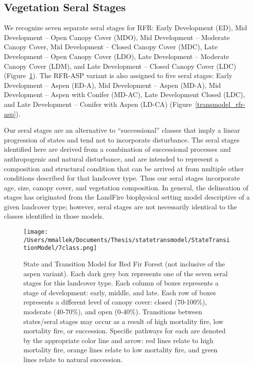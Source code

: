 \subsection*{Vegetation Seral Stages}
We recognize seven separate seral stages for RFR: Early Development (ED), Mid Development – Open Canopy Cover (MDO), Mid Development – Moderate Canopy Cover, Mid Development – Closed Canopy Cover (MDC), Late Development – Open Canopy Cover (LDO), Late Development – Moderate Canopy Cover (LDM), and Late Development – Closed Canopy Cover (LDC) (Figure~\ref{transmodel_rfr}). The RFR-ASP variant is also assigned to five seral stages: Early Development – Aspen (ED-A), Mid Development – Aspen (MD-A), Mid Development – Aspen with Conifer (MD-AC), Late Development Closed (LDC), and Late Development – Conifer with Aspen (LD-CA) (Figure~\ref{transmodel_rfr-asp}). 

Our seral stages are an alternative to ``successional'' classes that imply a linear progression of states and tend not to incorporate disturbance. The seral stages identified here are derived from a combination of successional processes and anthropogenic and natural disturbance, and are intended to represent a composition and structural condition that can be arrived at from multiple other conditions described for that landcover type. Thus our seral stages incorporate age, size, canopy cover, and vegetation composition. In general, the delineation of stages has originated from the LandFire biophysical setting model descriptive of a given landcover type; however, seral stages are not necessarily identical to the classes identified in those models.

\begin{figure}[htbp]
\centering
\texttt{[image: /Users/mmallek/Documents/Thesis/statetransmodel/StateTransitionModel/7class.png]}
\caption{State and Transition Model for Red Fir Forest (not inclusive of the aspen variant). Each dark grey box represents one of the seven seral stages for this landcover type. Each column of boxes represents a stage of development: early, middle, and late. Each row of boxes represents a different level of canopy cover: closed (70-100\%), moderate (40-70\%), and open (0-40\%). Transitions between states/seral stages may occur as a result of high mortality fire, low mortality fire, or succession. Specific pathways for each are denoted by the appropriate color line and arrow: red lines relate to high mortality fire, orange lines relate to low mortality fire, and green lines relate to natural succession.} 
\label{transmodel_rfr}
\end{figure}

